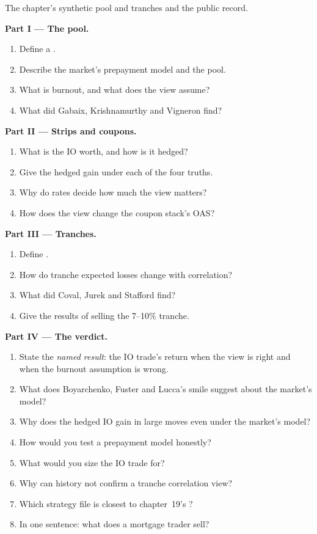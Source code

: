 \begin{problem}\label{pb:s2:mortgage-and-structured-credit-strategies:1}
The chapter's synthetic pool and tranches and the public record.

\medskip\noindent\textbf{Part I --- The pool.}
\begin{enumerate}
\item Define a .
\item Describe the market's prepayment model and the pool.
\item What is burnout, and what does the view assume?
\item What did Gabaix, Krishnamurthy and Vigneron find?
\end{enumerate}

\medskip\noindent\textbf{Part II --- Strips and coupons.}
\begin{enumerate}[resume]
\item What is the IO worth, and how is it hedged?
\item Give the hedged gain under each of the four truths.
\item Why do rates decide how much the view matters?
\item How does the view change the coupon stack's OAS?
\end{enumerate}

\medskip\noindent\textbf{Part III --- Tranches.}
\begin{enumerate}[resume]
\item Define .
\item How do tranche expected losses change with correlation?
\item What did Coval, Jurek and Stafford find?
\item Give the results of selling the 7--10\% tranche.
\end{enumerate}

\medskip\noindent\textbf{Part IV --- The verdict.}
\begin{enumerate}[resume]
\item State the \emph{named result}: the IO trade's return when the view is right and when the burnout assumption is wrong.
\item What does Boyarchenko, Fuster and Lucca's smile suggest about the market's model?
\item Why does the hedged IO gain in large moves even under the market's model?
\item How would you test a prepayment model honestly?
\item What would you size the IO trade for?
\item Why can history not confirm a tranche correlation view?
\item Which strategy file is closest to chapter~19's ?
\item In one sentence: what does a mortgage trader sell?
\end{enumerate}
\end{problem}

